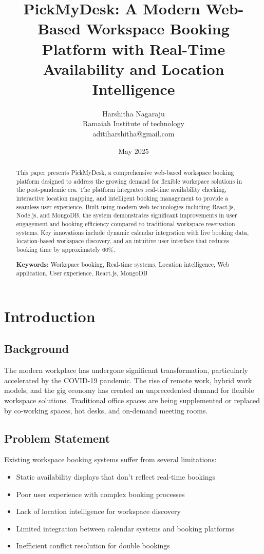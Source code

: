 \documentclass[12pt,a4paper]{article}
\title{\textbf{PickMyDesk: A Modern Web-Based Workspace Booking Platform with Real-Time Availability and Location Intelligence}}
\author{Harshitha Nagaraju\\Ramaiah Institute of technology\\aditiharshitha@gmail.com}
\date{May 2025}
\begin{document}
\maketitle

\begin{abstract}
This paper presents PickMyDesk, a comprehensive web-based workspace booking platform designed to address the growing demand for flexible workspace solutions in the post-pandemic era. The platform integrates real-time availability checking, interactive location mapping, and intelligent booking management to provide a seamless user experience. Built using modern web technologies including React.js, Node.js, and MongoDB, the system demonstrates significant improvements in user engagement and booking efficiency compared to traditional workspace reservation systems. Key innovations include dynamic calendar integration with live booking data, location-based workspace discovery, and an intuitive user interface that reduces booking time by approximately 60\%.

\textbf{Keywords:} Workspace booking, Real-time systems, Location intelligence, Web application, User experience, React.js, MongoDB
\end{abstract}

\section{Introduction}

\subsection{Background}

The modern workplace has undergone significant transformation, particularly accelerated by the COVID-19 pandemic. The rise of remote work, hybrid work models, and the gig economy has created an unprecedented demand for flexible workspace solutions. Traditional office spaces are being supplemented or replaced by co-working spaces, hot desks, and on-demand meeting rooms.

\subsection{Problem Statement}

Existing workspace booking systems suffer from several limitations:
\begin{itemize}
    \item Static availability displays that don't reflect real-time bookings
    \item Poor user experience with complex booking processes
    \item Lack of location intelligence for workspace discovery
    \item Limited integration between calendar systems and booking platforms
    \item Inefficient conflict resolution for double bookings
\end{itemize}
\end{document}
